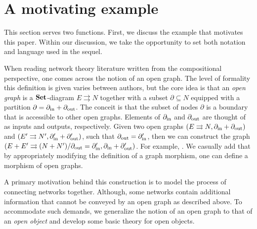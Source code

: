 %
%


\section{A motivating example} 
\label{sec:MotivatingExample}

This section serves two functions. First, we discuss the example that motivates this paper.  Within our discussion, we take the opportunity to set both notation and language used in the sequel.  

When reading network theory literature written from the compositional perspective, one comes across the notion of an open graph. 
The level of formality this definition is given varies between authors, but the core idea is that an \emph{open graph} is a $ \mathbf{Set} $-diagram $ E \rightrightarrows N $ together with a subset $ \partial \subseteq N$ equipped with a partition $ \partial = \partial_{ \text{in} } + \partial_{ \text{out} } $.
The conceit is that the subset of nodes $ \partial $ is a boundary that is accessible to other open graphs. Elements of $ \partial_{ \text{in} } $ and $ \partial_{ \text{out} } $ are thought of as inputs and outputs, respectively.  Given two open graphs $ (E \rightrightarrows N , \partial_{ \text{in} } + \partial_{ \text{out} }) $ and $ (E' \rightrightarrows N' , \partial'_{ \text{in} } + \partial'_{ \text{out} }) $, such that $ \partial_{ \text{out} } = \partial'_{ \text{in} } $, then we can construct the graph $ (E + E' \rightrightarrows (N + N') / \partial_{ \text{out} } = \partial'_{ \text{in} } ,  \partial_{ \text{in} } + \partial'_{ \text{out} } ) $.  For example,
	.
We casually add that by appropriately modifying the definition of a graph morphism, one can define a morphism of open graphs.

A primary motivation behind this construction is to model the process of connecting networks together.  Although, some networks contain additional information that cannot be conveyed by an open graph as described above.
To accommodate such demands, we generalize the notion of an open graph to that of an \emph{open object} and develop some basic theory for open objects.  

